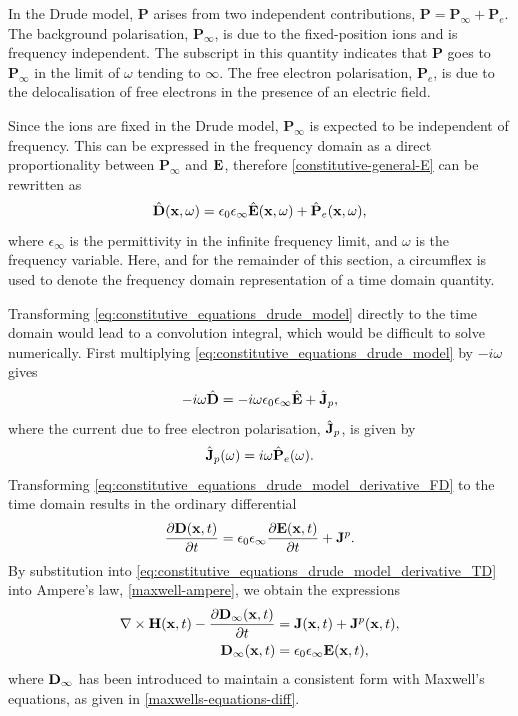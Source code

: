 In the Drude model, $\mathbf{P}$ arises from two independent contributions, $\mathbf{P} = \mathbf{P}_{\infty} + \mathbf{P}_e$. The background polarisation, $\mathbf{P}_{\infty}$, is due to the fixed-position ions and is frequency independent. The subscript in this quantity indicates that $\mathbf{P}$ goes to $\mathbf{P}_{\infty}$ in the limit of $\omega$ tending to $\infty$. The free electron polarisation, $\mathbf{P}_e$, is due to the delocalisation of free electrons in the presence of an electric field.

Since the ions are fixed in the Drude model, $\mathbf{P}_{\infty}$ is expected to be independent of frequency. This can be expressed in the frequency domain as a direct proportionality between $\mathbf{P}_{\infty}$ and $\mathbf{E}$, therefore \eqref{constitutive-general-E} can be rewritten as
%
\begin{equation}
\label{eq:constitutive_equations_drude_model}
\hat{\mathbf{D}}(\mathbf{x},\omega) = \epsilon_0 \epsilon_{\infty}  \hat{\mathbf{E}}(\mathbf{x}, \omega) + \hat{\mathbf{P}}_e(\mathbf{x},\omega) ,
\end{equation}
%
where $\epsilon_{\infty}$ is the permittivity in the infinite frequency limit, and $\omega$ is the frequency variable. Here, and for the remainder of this section, a circumflex is used to denote the frequency domain representation of a time domain quantity.

Transforming \eqref{eq:constitutive_equations_drude_model} directly to the time domain would lead to a convolution integral, which would be difficult to solve numerically. First multiplying \eqref{eq:constitutive_equations_drude_model} by $ -i \omega$ gives
\begin{equation}
\label{eq:constitutive_equations_drude_model_derivative_FD}
- i \omega \hat{\mathbf{D}} = -i \omega \epsilon_0 \epsilon_{\infty} \hat{\mathbf{E}} + \hat{\mathbf{J}}_p,
\end{equation}
where the current due to free electron polarisation, $\hat{\mathbf{J}}_p$, is given by
\begin{equation}
\label{eq:drude-free-elect-current-defn}
\hat{\mathbf{J}}_p(\omega) = i \omega \hat{\mathbf{P}}_e(\omega) .
\end{equation}
Transforming \eqref{eq:constitutive_equations_drude_model_derivative_FD} to the time domain results in the ordinary differential
\begin{equation}
\label{eq:constitutive_equations_drude_model_derivative_TD}
\frac{\partial  \mathbf{D} (\mathbf{x},t) }{\partial t}= \epsilon_0 \epsilon_{\infty} \frac{\partial  \mathbf{E} (\mathbf{x}, t) }{\partial t} + \mathbf{J}^p .
\end{equation}
By substitution into \eqref{eq:constitutive_equations_drude_model_derivative_TD} into Ampere's law, \eqref{maxwell-ampere}, we obtain the expressions
\begin{subequations}
\label{eq:drude-ampere}
    \begin{align}
        \nabla \times \mathbf{H}(\mathbf{x},t) - \frac{\partial \mathbf{D}_{\infty}(\mathbf{x}, t)}{\partial t} &= \mathbf{J}(\mathbf{x},t) + \mathbf{J}^p(\mathbf{x},t) , \\
        \mathbf{D}_{\infty}(\mathbf{x}, t) &= \epsilon_0 \epsilon_{\infty} \mathbf{E}(\mathbf{x}, t),
    \end{align}
\end{subequations}
where $\mathbf{D}_{\infty}$ has been introduced to maintain a consistent form with Maxwell's equations, as given in \eqref{maxwells-equations-diff}.

